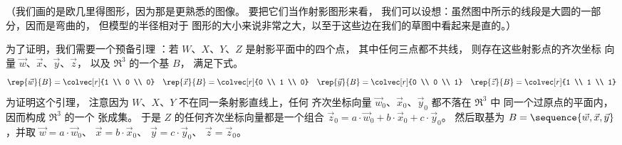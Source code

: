 （我们画的是欧几里得图形，因为那是更熟悉的图像。
要把它们当作射影图形来看，
我们可以设想：虽然图中所示的线段是大圆的一部分，因而是弯曲的，
但模型的半径相对于
图形的大小来说非常之大，以至于这些边在我们的草图中看起来是直的。）

为了证明，我们需要一个预备引理 \cite{Coxeter}：若
$W$、$X$、$Y$、$Z$ 是射影平面中的四个点，
其中任何三点都不共线，
则存在这些射影点的齐次坐标
向量 $\vec{w}$、$\vec{x}$、$\vec{y}$、$\vec{z}$，
以及 $\Re^3$ 的一个基 $B$，
满足下式。
\begin{equation*}
  \rep{\vec{w}}{B}=\colvec[r]{1 \\ 0 \\ 0}
  \quad
  \rep{\vec{x}}{B}=\colvec[r]{0 \\ 1 \\ 0}
  \quad
  \rep{\vec{y}}{B}=\colvec[r]{0 \\ 0 \\ 1}
  \quad
  \rep{\vec{z}}{B}=\colvec[r]{1 \\ 1 \\ 1}
\end{equation*}
为证明这个引理，
注意因为 $W$、$X$、$Y$ 不在同一条射影直线上，任何
齐次坐标向量
$\vec{w}_0$、$\vec{x}_0$、$\vec{y}_0$ 都不落在 $\Re^3$ 中
同一个过原点的平面内，因而构成 $\Re^3$ 的一个
张成集。
于是 $Z$ 的任何齐次坐标向量都是一个组合
$\vec{z}_0=a\cdot\vec{w}_0+b\cdot\vec{x}_0+c\cdot\vec{y}_0$。
然后取基为 $B=\sequence{\vec{w},\vec{x},\vec{y}}$，并取
$\vec{w}=a\cdot\vec{w}_0$、
$\vec{x}=b\cdot\vec{x}_0$、
$\vec{y}=c\cdot\vec{y}_0$、
$\vec{z}=\vec{z}_0$。

